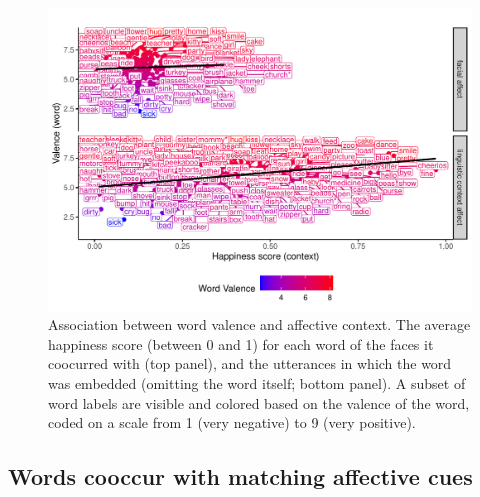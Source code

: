 \documentclass[10pt, letterpaper]{article}
\begin{document}
\begin{CodeChunk}
\begin{figure}[h]

{\centering \includegraphics{figs/figure2-1} 

}

\caption[Association between word valence and affective context]{Association between word valence and affective context. The average happiness score (between 0 and 1) for each word of the faces it coocurred with (top panel), and the utterances in which the word was embedded (omitting the word itself; bottom panel). A subset of word labels are visible and colored based on the valence of the word, coded on a scale from 1 (very negative) to 9 (very positive).}\label{fig:figure2}
\end{figure}
\end{CodeChunk}

\subsection{Words cooccur with matching affective
cues}\label{words-cooccur-with-matching-affective-cues}
\end{document}
